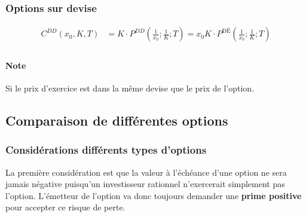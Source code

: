 \documentclass[10pt, french]{article}
\begin{document}
\begin{multicols*}{2}
\subsubsection*{Options sur devise}
\begin{align*}
	C^{DD}(x_0, K, T) 
	&= 	K \cdot P^{DD}\left( \frac{1}{x_0}; \frac{1}{K}; T \right) 
	= 	x_0	K \cdot P^{\text{DÉ}} \left( \frac{1}{x_0}; \frac{1}{K}; T \right) \\
\end{align*}

\paragraph{Note}	Si le prix d'exercice est dans la même devise que le prix de l'option.

\columnbreak
\subsection{Comparaison de différentes options}

%
%

\subsubsection*{Considérations différents types d'options}

La première considération est que la valeur à l'échéance d'une option ne sera jamais négative puisqu'un investisseur \og rationnel \fg{} n'exercerait simplement pas l'option. L'émetteur de l'option va donc toujours demander une \textbf{prime positive} pour accepter ce risque de perte.\\


\end{multicols*}
\end{document}
